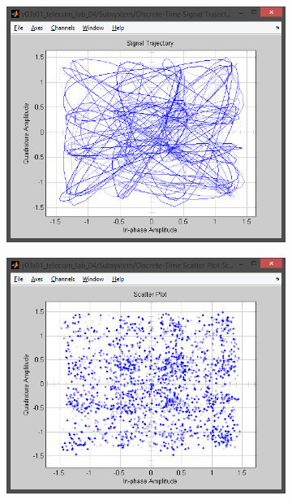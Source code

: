 \documentclass[
	a4paper,
	oneside,
	BCOR = 10mm,
	DIV = 12,
	12pt,
	headings = normal,
]{scrartcl}
\begin{document}
\begin{figure}[!htbp]
\begin{subfigure}{\textwidth / 3}
						\caption{}
						\label{subfig:rolloff-0p4-eye-out}
					\end{subfigure}%
					\begin{subfigure}{\textwidth / 3}
						\centering
						\includegraphics[height = 7\baselineskip]{../01-solution/rolloff-0p4-signal-trajectory-out.png}
						\caption{}
						\label{subfig:rolloff-0p4-signal-trajectory-out}
					\end{subfigure}%
					\begin{subfigure}{\textwidth / 3}
						\centering
						\includegraphics[height = 7\baselineskip]{../01-solution/rolloff-0p4-scatter-plot-out.png}

\end{subfigure}
\end{figure}
\end{document}
